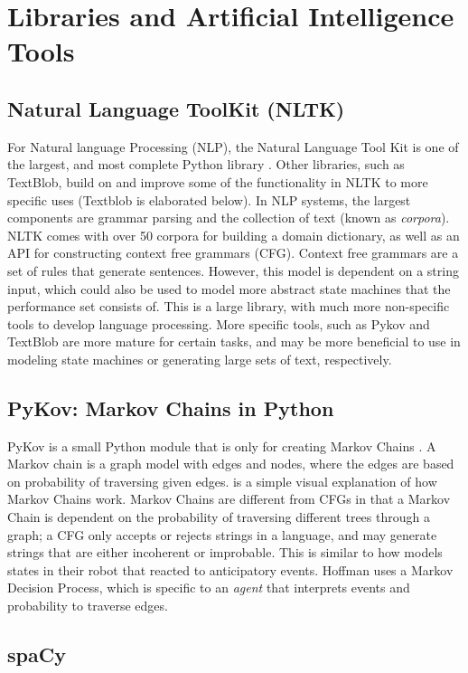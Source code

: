 \documentclass[onecolumn, draftclsnofoot,10pt, compsoc]{IEEEtran}
\begin{document}
\section{Libraries and Artificial Intelligence Tools}
  \subsection{Natural Language ToolKit (NLTK)}
    For Natural language Processing (NLP), the Natural Language Tool Kit is one of the largest, and most complete Python library \cite{nltk}. Other libraries, such as TextBlob, build on and improve some of the functionality in NLTK to more specific uses (Textblob is elaborated below). In NLP systems, the largest components are grammar parsing and the collection of text (known as \textit{corpora}). NLTK comes with over 50 corpora for building a domain dictionary, as well as an API for constructing context free grammars (CFG). Context free grammars are a set of rules that generate sentences. However, this model is dependent on a string input, which could also be used to model more abstract state machines that the performance set consists of. This is a large library, with much more non-specific tools to develop language processing. More specific tools, such as Pykov and TextBlob are more mature for certain tasks, and may be more beneficial to use in modeling state machines or generating large sets of text, respectively.

  \subsection{PyKov: Markov Chains in Python}
    PyKov is a small Python module that is only for creating Markov Chains \cite{pykov}. A Markov chain is a graph model with edges and nodes, where the edges are based on probability of traversing given edges. \cite{visualmarkov} is a simple visual explanation of how Markov Chains work. Markov Chains are different from CFGs in that a Markov Chain is dependent on the probability of traversing different trees through a graph; a CFG only accepts or rejects strings in a language, and may generate strings that are either incoherent or improbable. This is similar to how \cite{hoffman2010anticipation} models states in their robot that reacted to anticipatory events. Hoffman uses a Markov Decision Process, which is specific to an \textit{agent} that interprets events and probability to traverse edges. 

  \subsection{spaCy}
\end{document}
